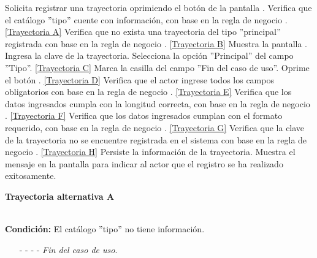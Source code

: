 	\begin{UCtrayectoria}
		\UCpaso[\UCactor] Solicita registrar una trayectoria oprimiendo el botón  de la pantalla .
		\UCpaso[\UCsist] Verifica que el catálogo ''tipo'' cuente con información, con base en la regla de negocio . \hyperlink{CU12-1-1-1:TAA}{[Trayectoria A]}
		\UCpaso[\UCsist] Verifica que no exista una trayectoria del tipo ''principal'' registrada con base en la regla de negocio . \hyperlink{CU12-1-1-1:TAB}{[Trayectoria B]}
		\UCpaso[\UCsist] Muestra la pantalla . \label{CU12.1.1.1-P17}
		\UCpaso[\UCactor] Ingresa la clave de la trayectoria. \label{CU12.1.1.1-P16}
		\UCpaso[\UCactor] Selecciona la opción ''Principal'' del campo ''Tipo''. \hyperlink{CU12-1-1-1:TAC}{[Trayectoria C]} 
		\UCpaso[\UCsist] Marca la casilla del campo ''Fin del caso de uso''.
		\UCpaso[\UCactor] Oprime el botón  . \hyperlink{CU12-1-1-1:TAD}{[Trayectoria D]} \label{CU12.1.1.1-P18}
		\UCpaso[\UCsist] Verifica que el actor ingrese todos los campos obligatorios con base en la regla de negocio . \hyperlink{CU12-1-1-1:TAE}{[Trayectoria E]}
		\UCpaso[\UCsist] Verifica que los datos ingresados cumpla con la longitud correcta, con base en la regla de negocio . \hyperlink{CU12-1-1-1:TAF}{[Trayectoria F]}
		\UCpaso[\UCsist] Verifica que los datos ingresados cumplan con el formato requerido, con base en la regla de negocio . \hyperlink{CU12-1-1-1:TAG}{[Trayectoria G]}
		\UCpaso[\UCsist] Verifica que la clave de la trayectoria no se encuentre registrada en el sistema con base en la regla de negocio . \hyperlink{CU12-1-1-1:TAH}{[Trayectoria H]}
		\UCpaso[\UCsist] Persiste la información de la trayectoria.
		\UCpaso[\UCsist] Muestra el mensaje  en la pantalla  para indicar al actor que el registro se ha realizado exitosamente.
	\end{UCtrayectoria}		
\hypertarget{CU12-1-1-1:TAA}{\textbf{Trayectoria alternativa A}}\\
\noindent \textbf{Condición:} El catálogo ''tipo'' no tiene información.
\begin{enumerate}
	\UCpaso[\UCsist] Muestra el mensaje  en la pantalla  para indicar que no es posible realizar la operación debido a la falta de información necesaria para el sistema.
	\item[- -] - - {\em {Fin del caso de uso}}.%
\end{enumerate}
